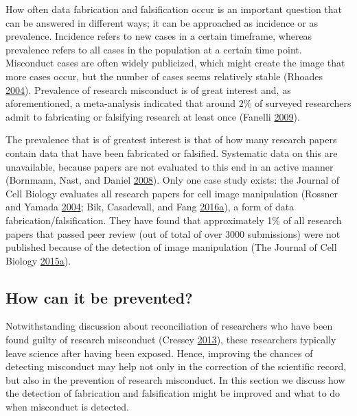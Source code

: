\documentclass[a5paper]{book}
\begin{document}
How often data fabrication and falsification occur is an important
question that can be answered in different ways; it can be approached as
incidence or as prevalence. Incidence refers to new cases in a certain
timeframe, whereas prevalence refers to all cases in the population at a
certain time point. Misconduct cases are often widely publicized, which
might create the image that more cases occur, but the number of cases
seems relatively stable (Rhoades
\protect\hyperlink{ref-rhoades2004}{2004}). Prevalence of research
misconduct is of great interest and, as aforementioned, a meta-analysis
indicated that around 2\% of surveyed researchers admit to fabricating
or falsifying research at least once (Fanelli
\protect\hyperlink{ref-doi:10.1371ux2fjournal.pone.0005738}{2009}).

The prevalence that is of greatest interest is that of how many research
papers contain data that have been fabricated or falsified. Systematic
data on this are unavailable, because papers are not evaluated to this
end in an active manner (Bornmann, Nast, and Daniel
\protect\hyperlink{ref-doi:10.1007ux2fs11192-007-1950-2}{2008}). Only
one case study exists: the Journal of Cell Biology evaluates all
research papers for cell image manipulation (Rossner and Yamada
\protect\hyperlink{ref-doi:10.1083ux2fjcb.200406019}{2004}; Bik,
Casadevall, and Fang
\protect\hyperlink{ref-doi:10.1128ux2fmbio.00809-16}{2016}\protect\hyperlink{ref-doi:10.1128ux2fmbio.00809-16}{a}),
a form of data fabrication/falsification. They have found that
approximately 1\% of all research papers that passed peer review (out of
total of over 3000 submissions) were not published because of the
detection of image manipulation (The Journal of Cell Biology
\protect\hyperlink{ref-cellbio2015}{2015}\protect\hyperlink{ref-cellbio2015}{a}).

\subsection{How can it be prevented?}\label{how-can-it-be-prevented-1}

Notwithstanding discussion about reconciliation of researchers who have
been found guilty of research misconduct (Cressey
\protect\hyperlink{ref-doi:10.1038ux2f493147a}{2013}), these researchers
typically leave science after having been exposed. Hence, improving the
chances of detecting misconduct may help not only in the correction of
the scientific record, but also in the prevention of research
misconduct. In this section we discuss how the detection of fabrication
and falsification might be improved and what to do when misconduct is
detected.
\end{document}

